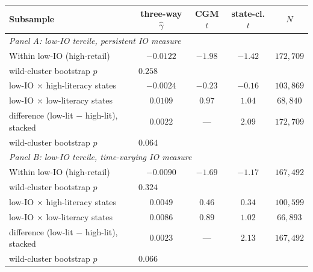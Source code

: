 \begin{tabular}{lcccc}
\hline\hline
Subsample & three-way $\hat\gamma$ & CGM $t$ & state-cl. $t$ & $N$ \\
\hline
\multicolumn{5}{l}{\textit{Panel A: low-IO tercile, persistent IO measure}} \\
Within low-IO (high-retail) & $-0.0122$ & $-1.98$ & $-1.42$ & $172,709$ \\
\quad wild-cluster bootstrap $p$ & \multicolumn{4}{l}{$0.258$} \\
\quad low-IO $\times$ high-literacy states & $-0.0024$ & $-0.23$ & $-0.16$ & $103,869$ \\
\quad low-IO $\times$ low-literacy states & $0.0109$ & $0.97$ & $1.04$ & $68,840$ \\
\quad difference (low-lit $-$ high-lit), stacked & $0.0022$ & --- & $2.09$ & $172,709$ \\
\quad\quad wild-cluster bootstrap $p$ & \multicolumn{4}{l}{$0.064$} \\
\hline
\multicolumn{5}{l}{\textit{Panel B: low-IO tercile, time-varying IO measure}} \\
Within low-IO (high-retail) & $-0.0090$ & $-1.69$ & $-1.17$ & $167,492$ \\
\quad wild-cluster bootstrap $p$ & \multicolumn{4}{l}{$0.324$} \\
\quad low-IO $\times$ high-literacy states & $0.0049$ & $0.46$ & $0.34$ & $100,599$ \\
\quad low-IO $\times$ low-literacy states & $0.0086$ & $0.89$ & $1.02$ & $66,893$ \\
\quad difference (low-lit $-$ high-lit), stacked & $0.0023$ & --- & $2.13$ & $167,492$ \\
\quad\quad wild-cluster bootstrap $p$ & \multicolumn{4}{l}{$0.066$} \\
\hline\hline
\end{tabular}
